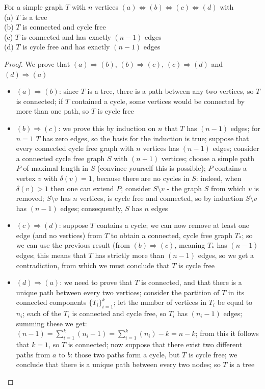 \begin{theorem}
For a simple graph $T$ with $n$ vertices
 $(a) \Leftrightarrow
  (b) \Leftrightarrow (c) \Leftrightarrow (d)$ with \\[2mm]
(a) $T$ is a tree\\
(b) $T$ is connected and cycle free\\
(c) $T$ is connected and has exactly $(n-1)$ edges\\
(d) $T$ is cycle free and has exactly $(n-1)$ edges
\end{theorem}
\begin{proof} We prove that $(a) \Rightarrow (b)$, $(b) \Rightarrow
(c)$, $(c) \Rightarrow (d)$ and $(d) \Rightarrow (a)$
\begin{itemize}
\item $(a) \Rightarrow (b)$: since $T$ is a tree, there is a path
between any two vertices, so $T$ is connected; if $T$ contained a
cycle, some vertices would be connected by more than one path, so $T$
is cycle free
\item $(b) \Rightarrow (c)$:
we prove this by induction on $n$ that $T$ has $(n-1)$ edges; for
$n=1$ $T$ has zero edges, so the basis for the induction is true;
suppose that every connected cycle free graph with $n$ vertices has
$(n-1)$ edges; consider a connected cycle free graph $S$ with $(n+1)$
vertices; choose a simple path $P$ of maximal length in $S$
(convince yourself this is possible); $P$ contains a vertex $v$ with
$\delta(v) = 1$, because there are no cycles in $S$: indeed, when
$\delta(v) > 1$ then one can extend $P$; consider $S \setminus v$ -
the graph $S$ from which $v$ is removed; $S \setminus v$ has $n$
vertices, is cycle free and connected, so by induction $S \setminus v$
has $(n-1)$ edges; consequently, $S$ has $n$ edges

\item $(c) \Rightarrow (d)$: suppose $T$ contains a cycle; we can now
remove at least one edge (and no vertices) from $T$ to obtain a
connected, cycle free graph $T_{*}$; so we can use the previous result
(from $(b) \Rightarrow (c)$, meaning $T_{*}$ has $(n-1)$ edges; this
means that $T$ has strictly more than $(n-1)$ edges, so we get a
contradiction, from which we must conclude that $T$ is cycle free

\item $(d) \Rightarrow (a)$:
we need to prove that $T$ is connected, and that there is a unique
path between every two vertices; consider the partition of $T$ in its
connected components $\{T_{i}\}_{i=1}^{k}$; let the number of vertices
in $T_{i}$ be equal to $n_{i}$; each of the $T_{i}$ is connected and
cycle free, so $T_{i}$ has $(n_{i}-1)$ edges; summing these we get:
$(n-1) = \sum_{i=1}^{k} (n_{i}-1) = \sum_{i=1}^{k} (n_{i}) - k = n - k$;
from this it follows that $k=1$, so $T$ is connected; now suppose that
there exist two different paths from $a$ to $b$: those two paths form
a cycle, but $T$ is cycle free; we conclude that there is a unique
path between every two nodes; so $T$ is a tree

\end{itemize}
\end{proof}

